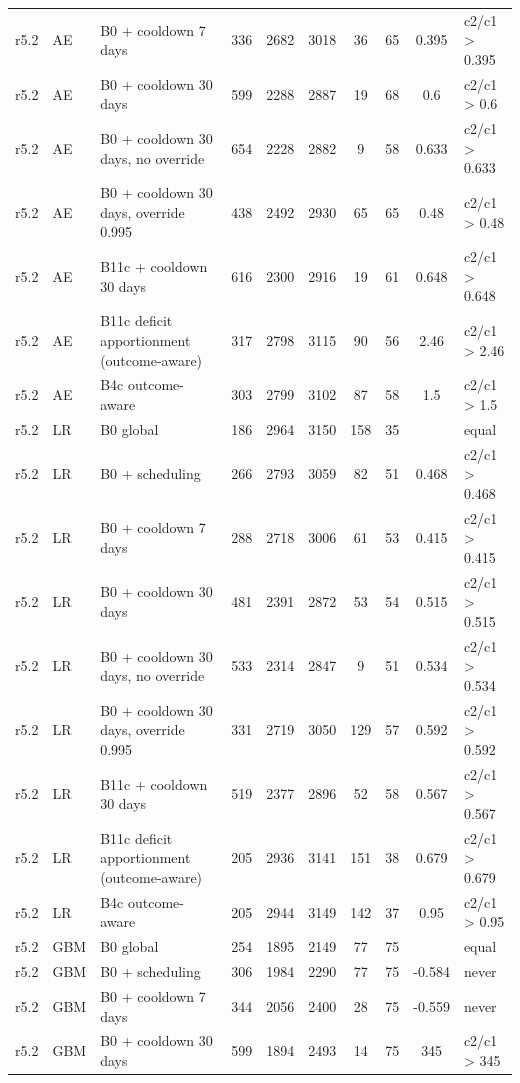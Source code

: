 \documentclass[10pt,onecolumn,letterpaper]{article}
\begin{document}
\begin{longtable}{llp{4.6cm}ccccccl}
r5.2 & AE & B0 + cooldown 7 days & 336 & 2682 & 3018 & 36 & 65 & 0.395 & c2/c1 > 0.395 \\
r5.2 & AE & B0 + cooldown 30 days & 599 & 2288 & 2887 & 19 & 68 & 0.6 & c2/c1 > 0.6 \\
r5.2 & AE & B0 + cooldown 30 days, no override & 654 & 2228 & 2882 & 9 & 58 & 0.633 & c2/c1 > 0.633 \\
r5.2 & AE & B0 + cooldown 30 days, override 0.995 & 438 & 2492 & 2930 & 65 & 65 & 0.48 & c2/c1 > 0.48 \\
r5.2 & AE & B11c + cooldown 30 days & 616 & 2300 & 2916 & 19 & 61 & 0.648 & c2/c1 > 0.648 \\
r5.2 & AE & B11c deficit apportionment (outcome-aware) & 317 & 2798 & 3115 & 90 & 56 & 2.46 & c2/c1 > 2.46 \\
r5.2 & AE & B4c outcome-aware & 303 & 2799 & 3102 & 87 & 58 & 1.5 & c2/c1 > 1.5 \\
r5.2 & LR & B0 global & 186 & 2964 & 3150 & 158 & 35 &  & equal \\
r5.2 & LR & B0 + scheduling & 266 & 2793 & 3059 & 82 & 51 & 0.468 & c2/c1 > 0.468 \\
r5.2 & LR & B0 + cooldown 7 days & 288 & 2718 & 3006 & 61 & 53 & 0.415 & c2/c1 > 0.415 \\
r5.2 & LR & B0 + cooldown 30 days & 481 & 2391 & 2872 & 53 & 54 & 0.515 & c2/c1 > 0.515 \\
r5.2 & LR & B0 + cooldown 30 days, no override & 533 & 2314 & 2847 & 9 & 51 & 0.534 & c2/c1 > 0.534 \\
r5.2 & LR & B0 + cooldown 30 days, override 0.995 & 331 & 2719 & 3050 & 129 & 57 & 0.592 & c2/c1 > 0.592 \\
r5.2 & LR & B11c + cooldown 30 days & 519 & 2377 & 2896 & 52 & 58 & 0.567 & c2/c1 > 0.567 \\
r5.2 & LR & B11c deficit apportionment (outcome-aware) & 205 & 2936 & 3141 & 151 & 38 & 0.679 & c2/c1 > 0.679 \\
r5.2 & LR & B4c outcome-aware & 205 & 2944 & 3149 & 142 & 37 & 0.95 & c2/c1 > 0.95 \\
r5.2 & GBM & B0 global & 254 & 1895 & 2149 & 77 & 75 &  & equal \\
r5.2 & GBM & B0 + scheduling & 306 & 1984 & 2290 & 77 & 75 & -0.584 & never \\
r5.2 & GBM & B0 + cooldown 7 days & 344 & 2056 & 2400 & 28 & 75 & -0.559 & never \\
r5.2 & GBM & B0 + cooldown 30 days & 599 & 1894 & 2493 & 14 & 75 & 345 & c2/c1 > 345 \\

\end{longtable}
\end{document}
